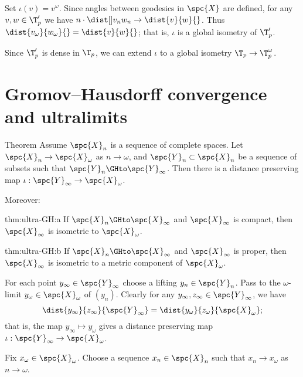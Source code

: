 Set $\iota(v)=v^\omega$.
Since angles between geodesics in $\spc{X}$ are defined, for any $v,w\in \T_p'$ we have
$n\cdot\dist[{{}}]{v_n}{w_n}{}\to\dist{v}{w}{}$.
Thus $\dist{v_\omega}{w_\omega}{}=\dist{v}{w}{}$; that is, $\iota$ is a global isometry of $\T_p'$.

Since $\T_p'$ is dense in $\T_p$,
we can extend $\iota$ to a global isometry $\T_p\to \T^\omega_p$.
\qeds

{\sloppy

\section[Gromov--Hausdorff and ultralimits]{Gromov--Hausdorff convergence and ultralimits}

}

\begin{thm}{Theorem}\label{thm:ultra-GH}
Assume $\spc{X}_n$ is a sequence of complete spaces. 
Let $\spc{X}_n\to \spc{X}_\omega$ as $n\to\omega$,
and $\spc{Y}_n\subset \spc{X}_n$ 
be a sequence of subsets such that $\spc{Y}_n\GHto\spc{Y}_\infty$. 
Then there is a distance preserving map 
$\iota:\spc{Y}_\infty\to \spc{X}_\omega$.

Moreover:

\begin{subthm}{thm:ultra-GH:a}
If $\spc{X}_n\GHto \spc{X}_\infty$ 
and $\spc{X}_\infty$ is compact, then 
$\spc{X}_\infty$ is isometric to $\spc{X}_\omega$.
\end{subthm}

\begin{subthm}{thm:ultra-GH:b}
If $\spc{X}_n\GHto \spc{X}_\infty$ 
and $\spc{X}_\infty$ is proper, then 
$\spc{X}_\infty$ is isometric to a metric component of $\spc{X}_\omega$.
\end{subthm}

\end{thm}

For each point $y_\infty\in \spc{Y}_\infty$ 
choose a lifting $y_n\in \spc{Y}_n$.
Pass to the $\omega$-limit $y_\omega\in \spc{X}_\omega$ of $(y_n)$.
Clearly for any $y_\infty,z_\infty\in \spc{Y}_\infty$, 
we have 
\[\dist{y_\infty}{z_\infty}{\spc{Y}_\infty}=\dist{y_\omega}{z_\omega}{\spc{X}_\omega};\] 
that is, the map $y_\infty\mapsto y_\omega$ gives a distance preserving map $\iota:\spc{Y}_\infty\to \spc{X}_\omega$. 


Fix $x_\omega\in \spc{X}_\omega$.
Choose a sequence $x_n\in \spc{X}_n$ 
such that $x_n\to x_\omega$ as $n\to\omega$. 

